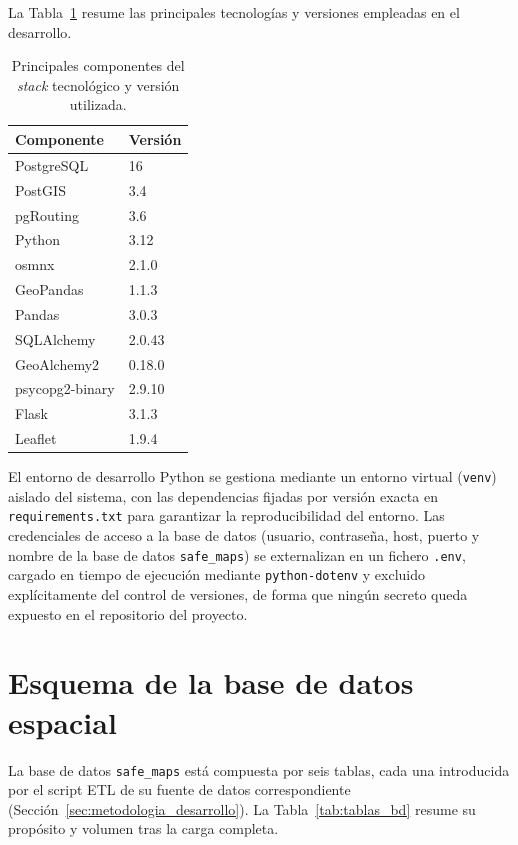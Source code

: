 La Tabla~\ref{tab:stack} resume las principales tecnologías y versiones empleadas en el desarrollo.

\begin{table}[htbp]
\centering
\begin{tabular}{ll}
\hline
\textbf{Componente} & \textbf{Versión} \\
\hline
PostgreSQL & 16 \\
PostGIS & 3.4 \\
pgRouting & 3.6 \\
Python & 3.12 \\
osmnx & 2.1.0 \\
GeoPandas & 1.1.3 \\
Pandas & 3.0.3 \\
SQLAlchemy & 2.0.43 \\
GeoAlchemy2 & 0.18.0 \\
psycopg2-binary & 2.9.10 \\
Flask & 3.1.3 \\
Leaflet & 1.9.4 \\
\hline
\end{tabular}
\caption{Principales componentes del \textit{stack} tecnológico y versión utilizada.}
\label{tab:stack}
\end{table}

El entorno de desarrollo Python se gestiona mediante un entorno virtual (\texttt{venv}) aislado del sistema, con las dependencias fijadas por versión exacta en \texttt{requirements.txt} para garantizar la reproducibilidad del entorno. Las credenciales de acceso a la base de datos (usuario, contraseña, host, puerto y nombre de la base de datos \texttt{safe\_maps}) se externalizan en un fichero \texttt{.env}, cargado en tiempo de ejecución mediante \texttt{python-dotenv} y excluido explícitamente del control de versiones, de forma que ningún secreto queda expuesto en el repositorio del proyecto.

\section{Esquema de la base de datos espacial}
\label{sec:esquema_bd}

La base de datos \texttt{safe\_maps} está compuesta por seis tablas, cada una introducida por el script ETL de su fuente de datos correspondiente (Sección~\ref{sec:metodologia_desarrollo}). La Tabla~\ref{tab:tablas_bd} resume su propósito y volumen tras la carga completa.

